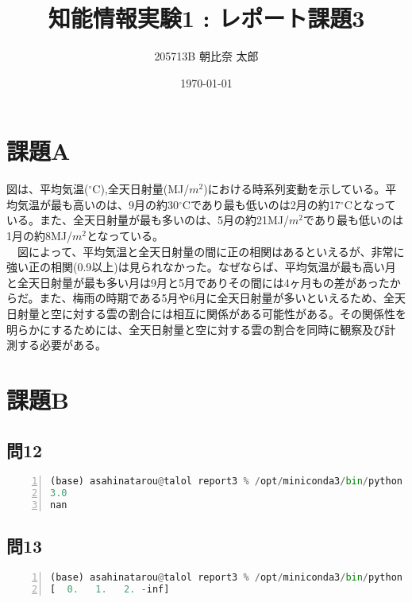 \documentclass[a4paper, 11pt, titlepage]{jsarticle}
\title {知能情報実験1 : レポート課題3}
\author{205713B  朝比奈 太郎}
\date{\today }
\begin{document}
\maketitle
\tableofcontents
\clearpage

\section{課題A}
図は、平均気温($^\circ$C),全天日射量(MJ/$m^2$)における時系列変動を示している。平均気温が最も高いのは、9月の約30$^\circ$Cであり最も低いのは2月の約17$^\circ$Cとなっている。また、全天日射量が最も多いのは、5月の約21MJ/$m^2$であり最も低いのは1月の約8MJ/$m^2$となっている。\\
\ \ 図によって、平均気温と全天日射量の間に正の相関はあるといえるが、非常に強い正の相関(0.9以上)は見られなかった。なぜならば、平均気温が最も高い月と全天日射量が最も多い月は9月と5月でありその間には4ヶ月もの差があったからだ。また、梅雨の時期である5月や6月に全天日射量が多いといえるため、全天日射量と空に対する雲の割合には相互に関係がある可能性がある。その関係性を明らかにするためには、全天日射量と空に対する雲の割合を同時に観察及び計測する必要がある。

\section{課題B}
\subsection{問12}


\begin{lstlisting}[language=Python, numbers=left, breaklines=true, basicstyle=\ttfamily\footnotesize, frame=single, caption=実行結果12,label=result]
(base) asahinatarou@talol report3 % /opt/miniconda3/bin/python /Users/taro/StuLab1/report3/sample12.py
3.0
nan
\end{lstlisting}
\newpage

\subsection{問13}


\begin{lstlisting}[language=Python, numbers=left, breaklines=true, basicstyle=\ttfamily\footnotesize, frame=single, caption=実行結果13,label=result]
(base) asahinatarou@talol report3 % /opt/miniconda3/bin/python /Users/taro/StuLab1/report3/sample13.py
[  0.   1.   2. -inf]
\end{lstlisting}
\end{document}
